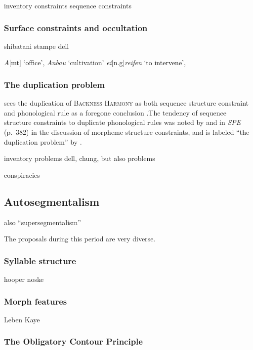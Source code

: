 {inventory constraints
sequence constraints

\subsubsection{Surface constraints and occultation}

shibatani
stampe
dell

\emph{A}[mt] `office', \emph{Anbau} `cultivation'
\emph{ei}[n.g]\emph{reifen} `to intervene',

\subsubsection{The duplication problem}

\citeauthor{Anderson1974} sees the duplication of \textsc{Backness Harmony} as both sequence structure constraint and phonological rule as a foregone conclusion
.The tendency of sequence structure constraints to duplicate phonological rules was noted by \citet[][401f.]{Stanley1967} and in \emph{SPE} (p.~382) in the discussion of morpheme structure constraints, and is labeled ``the duplication problem'' by \citet[][?]{Kenstowicz1977}.

inventory problems 
dell, chung, but also problems

conspiracies

\subsection{Autosegmentalism}

also ``supersegmentalism''

The proposals during this period are very diverse. 

\subsubsection{Syllable structure}

hooper
noske

\subsubsection{Morph features}

Leben
Kaye

\subsubsection{The Obligatory Contour Principle}

}
